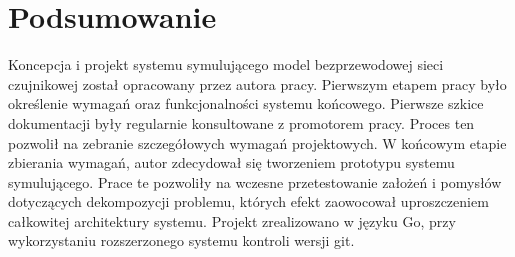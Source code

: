 \documentclass[a4paper,12pt,twoside,openany]{report}
\begin{document}
\chapter{Podsumowanie}
Koncepcja i projekt systemu symulującego model bezprzewodowej sieci czujnikowej został opracowany przez autora pracy.
Pierwszym etapem pracy było określenie wymagań oraz funkcjonalności systemu końcowego. Pierwsze szkice dokumentacji były regularnie konsultowane z promotorem pracy.
Proces ten pozwolił na zebranie szczegółowych wymagań projektowych. W końcowym etapie zbierania wymagań, autor zdecydował się tworzeniem prototypu systemu symulującego.
Prace te pozwoliły na wczesne przetestowanie założeń i pomysłów dotyczących dekompozycji problemu, których efekt zaowocował uproszczeniem całkowitej architektury systemu.
Projekt zrealizowano w języku Go, przy wykorzystaniu rozszerzonego systemu kontroli wersji git.


\begin{thebibliography}{99}
\end{thebibliography}

\zakonczenie  %
\end{document}
